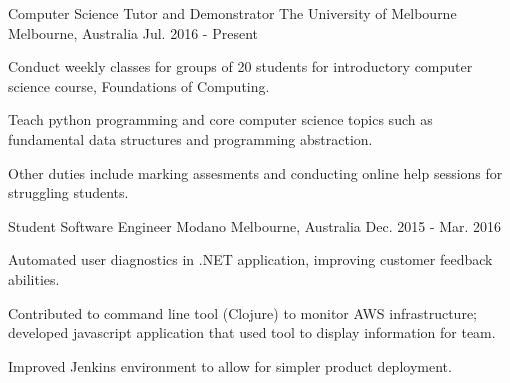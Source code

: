 \begin{cventries}
  \cventry
    {Computer Science Tutor and Demonstrator}
    {The University of Melbourne}
    {Melbourne, Australia}
    {Jul. 2016 - Present}
    {
      \begin{cvitems}
        \item {Conduct weekly classes for groups of 20 students for introductory computer science course, Foundations of Computing.}
        \item {Teach python programming and core computer science topics such as fundamental data structures and programming abstraction.}
        \item {Other duties include marking assesments and conducting online help sessions for struggling students.}
      \end{cvitems}
    }
  \cventry
    {Student Software Engineer}
    {Modano}
    {Melbourne, Australia}
    {Dec. 2015 - Mar. 2016}
    {
      \begin{cvitems}
        \item{Automated user diagnostics in .NET application, improving customer feedback abilities.}
        \item{Contributed to command line tool (Clojure) to monitor AWS infrastructure; developed javascript application that used tool to display information for team.}
        \item{Improved Jenkins environment to allow for simpler product deployment.}
      \end{cvitems}
    }
\end{cventries}
\vspace{-5mm}
